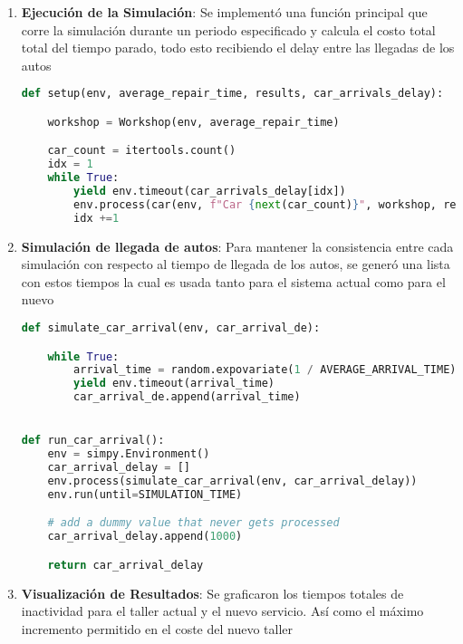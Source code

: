 \begin{enumerate}
\begin{lstlisting}[language=Python, caption=Función de simulación de llegada de autos,label={lst:lstlisting3}]
    \end{lstlisting}

    \item \textbf{Ejecución de la Simulación}: Se implementó una función principal que corre la simulación durante un periodo especificado y calcula el costo total total del tiempo parado, todo esto recibiendo el delay entre las llegadas de los autos

    \begin{lstlisting}[language=Python, caption=Función Principal de Simulación,label={lst:lstlisting6}]
def setup(env, average_repair_time, results, car_arrivals_delay):

    workshop = Workshop(env, average_repair_time)

    car_count = itertools.count()
    idx = 1
    while True:
        yield env.timeout(car_arrivals_delay[idx])
        env.process(car(env, f"Car {next(car_count)}", workshop, results))
        idx +=1
    \end{lstlisting}

    \pagebreak
    \item \textbf{Simulación de llegada de autos}: Para mantener la consistencia entre cada simulación con respecto al tiempo de llegada de los autos, se generó una lista con estos tiempos la cual es usada tanto para el sistema actual como para el nuevo

    \begin{lstlisting}[language=Python, caption=Simulación de delay entre llegada de autos,label={lst:lstlisting4}]
def simulate_car_arrival(env, car_arrival_de):

    while True:
        arrival_time = random.expovariate(1 / AVERAGE_ARRIVAL_TIME)
        yield env.timeout(arrival_time)
        car_arrival_de.append(arrival_time)


def run_car_arrival():
    env = simpy.Environment()
    car_arrival_delay = []
    env.process(simulate_car_arrival(env, car_arrival_delay))
    env.run(until=SIMULATION_TIME)

    # add a dummy value that never gets processed
    car_arrival_delay.append(1000)

    return car_arrival_delay

    \end{lstlisting}
    \pagebreak
    \item \textbf{Visualización de Resultados}: Se graficaron los tiempos totales de inactividad para el taller actual y el nuevo servicio. Así como el máximo incremento permitido en el coste del nuevo taller


\end{enumerate}
